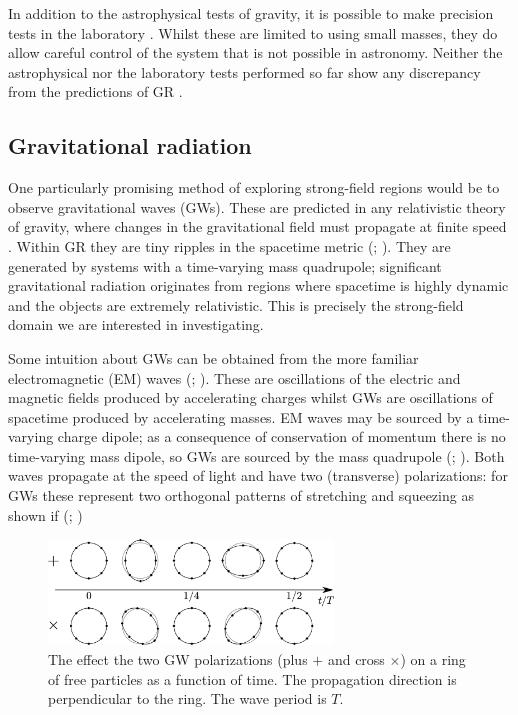 In addition to the astrophysical tests of gravity, it is possible to make precision tests in the laboratory \citep{Kapner2007a,Adelberger2009,Wagner2012}. Whilst these are limited to using small masses, they do allow careful control of the system that is not possible in astronomy. Neither the astrophysical nor the laboratory tests performed so far show any discrepancy from the predictions of GR \citep{Will2006}. 

\subsection{Gravitational radiation}

One particularly promising method of exploring strong-field regions would be to observe gravitational waves (GWs). These are predicted in any relativistic theory of gravity, where changes in the gravitational field must propagate at finite speed \citep{Schutz1984}. Within GR they are tiny ripples in the spacetime metric (\citealt[section 35.1]{Misner1973}; \citealt[section 107]{Landau1975}). They are generated by systems with a time-varying mass quadrupole; significant gravitational radiation originates from regions where spacetime is highly dynamic and the objects are extremely relativistic. This is precisely the strong-field domain we are interested in investigating.

Some intuition about GWs can be obtained from the more familiar electromagnetic (EM) waves (\citealt[sections 46--48 and 66--67]{Landau1975}; \citealt[sections 7.1 and 9.1--9.3]{Jackson1999}). These are oscillations of the electric and magnetic fields produced by accelerating charges whilst GWs are oscillations of spacetime produced by accelerating masses. EM waves may be sourced by a time-varying charge dipole; as a consequence of conservation of momentum there is no time-varying mass dipole, so GWs are sourced by the mass quadrupole (\citealt[section 18.5]{Hobson2006}; \citealt[section 15.4]{Rindler2006}). Both waves propagate at the speed of light and have two (transverse) polarizations: for GWs these represent two orthogonal patterns of stretching and squeezing as shown if  (\citealt[section 34]{Dirac1996}; \citealt[section 18.4]{Hobson2006})
\begin{figure}
  \begin{center}
  \includegraphics[width=0.675\textwidth]{./images/Polarization}
    \caption{The effect the two GW polarizations (plus $+$ and cross $\times$) on a ring of free particles as a function of time. The propagation direction is perpendicular to the ring. The wave period is $T$.}   
    \label{fig:plus-cross} 
  \end{center}
\end{figure}

